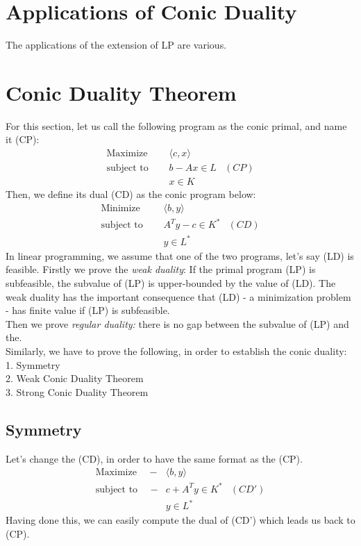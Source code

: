 \documentclass[12pt]{article}
\begin{document}
    
    \section{Applications of Conic Duality }
    \par The applications of the extension of LP are various. 
    
    \section{Conic Duality Theorem}
    For this section, let us call the following program as the conic primal, and name it (CP):
    \begin{align*}
    		     \text{Maximize } \quad  &\langle c,x \rangle \\
     		 \text{subject to } \quad  &b - Ax \in L &(CP)\\
 											  &x \in K   			
   	\end{align*}
   	Then, we define its dual (CD) as the conic program below:
   	 \begin{align*}
    		     \text{Minimize } \quad  &\langle b,y \rangle \\
     		 \text{subject to } \quad  &A^Ty - c \in K^* &(CD)\\
 											  &y \in L^*   			
   	\end{align*}
   	In linear programming, we assume that one of the two programs, let's say (LD) is feasible. Firstly we prove the \textit{weak duality}: If the primal program (LP) is subfeasible, the subvalue of (LP) is upper-bounded by the value of (LD). The weak duality has the important consequence that (LD) - a minimization problem - has finite value if (LP) is subfeasible. \\
   	Then we prove \textit{regular duality:} there is no gap between the subvalue of (LP) and the. \\
   	Similarly, we have to prove the following, in order to establish the conic duality: \\
   	1. Symmetry \\ 
	2. Weak Conic Duality Theorem \\
	3. Strong Conic Duality Theorem \\

	\subsection{Symmetry}
   	Let's change the (CD), in order to have the same format as the (CP).
   	\begin{align*}
    		     \text{Maximize } \quad  -&\langle b,y \rangle \\
     		 \text{subject to } \quad  -&c + A^Ty \in K^* &(CD')\\
 											  &y \in L^*   			
   	\end{align*}
	Having done this, we can easily compute the dual of (CD') which leads us back to (CP). \\
	
\end{document}
